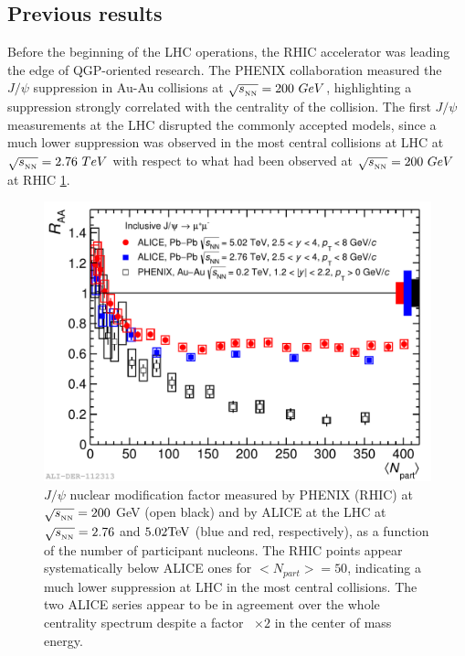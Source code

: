 \subsection{Previous results}
Before the beginning of the LHC operations, the RHIC accelerator was leading the edge of QGP-oriented research.
The PHENIX collaboration measured the $J/\psi$ suppression in Au-Au collisions at $\sqrt{s_{_{\rm NN}}}=200\ GeV$, highlighting a suppression strongly correlated with the centrality of the collision.
The first $J/\psi$ measurements at the LHC disrupted the commonly accepted models, since a much lower suppression was observed in the most central collisions at LHC at $\sqrt{s_{_{\rm NN}}}=2.76\ TeV$ with respect to what had been observed at $\sqrt{s_{_{\rm NN}}}=200\ GeV$ at RHIC \ref{fig:LHC_RHIC_jpsi}.

\begin{figure}[!t]
\begin{center}
\includegraphics[width=0.8\linewidth]{Chapters/Analysis/Figs/2016-Sep-15-RAA_centr_Alice5_Alice276_Phenix.pdf}
\caption{$J/\psi$ nuclear modification factor measured by PHENIX (RHIC) at $\sqrt{s_{_{\rm NN}}}=200$ GeV (open black) and by ALICE at the LHC at $\sqrt{s_{_{\rm NN}}}=2.76$ and $5.02 \rm{TeV}$ (blue and red, respectively), as a function of the number of participant nucleons. The RHIC points appear systematically below ALICE ones for $<N_{part}>=50$, indicating a much lower suppression at LHC in the most central collisions. The two ALICE series appear to be in agreement over the whole centrality spectrum despite a factor ~$\times2$ in the center of mass energy. }
\label{fig:LHC_RHIC_jpsi}
\end{center}
\end{figure}


